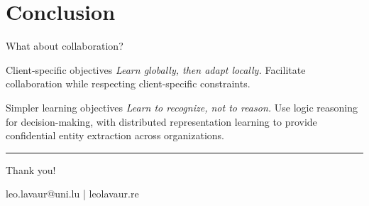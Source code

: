 \section{Conclusion}

\begin{frame}{What about collaboration?}

  \begin{block}{Client-specific objectives}
    \textit{Learn globally, then adapt locally.}
    Facilitate collaboration while respecting \alert{client-specific constraints}.
  \end{block}

  \pause
  \begin{block}{Simpler learning objectives}
    \textit{Learn to recognize, not to reason.}
    Use logic reasoning for decision-making, with \alert{distributed representation learning} to provide confidential entity extraction across organizations.
  \end{block}


  \pause
  \bigskip\centering\rule{.4\textwidth}{.4pt}

  \medskip\Large \alert{Thank you!}

  \medskip\normalfont\ttfamily
  leo.lavaur@uni.lu | leolavaur.re
\end{frame}




